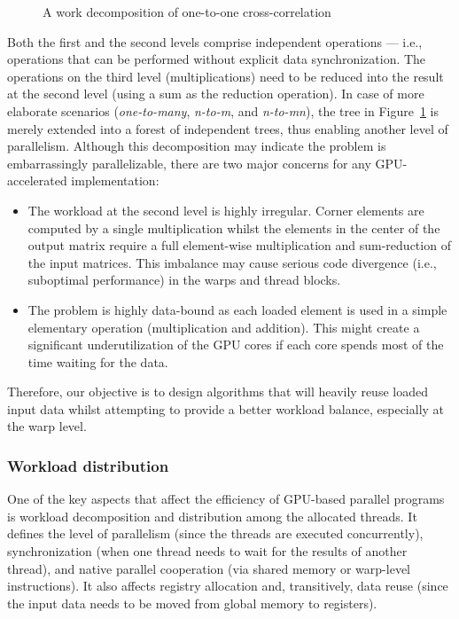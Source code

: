 \begin{figure}[ht]
	\fontsize{5}{6}\selectfont
	\centering
	\def\svgwidth{0.65\textwidth}
	
	\caption{A work decomposition of one-to-one cross-correlation}
	\label{fig:cross_corr_one_to_one_tasks}
\end{figure}

Both the first and the second levels comprise independent operations --- i.e., operations that can be performed without explicit data synchronization. The operations on the third level (multiplications) need to be reduced into the result at the second level (using a sum as the reduction operation). In case of more elaborate scenarios (\textit{one-to-many}, \textit{n-to-m}, and \textit{n-to-mn}), the tree in Figure~\ref{fig:cross_corr_one_to_one_tasks} is merely extended into a forest of independent trees, thus enabling another level of parallelism. Although this decomposition may indicate the problem is embarrassingly parallelizable, there are two major concerns for any GPU-accelerated implementation:

\begin{itemize}
	\item The workload at the second level is highly irregular. Corner elements are computed by a single multiplication whilst the elements in the center of the output matrix require a full element-wise multiplication and sum-reduction of the input matrices. This imbalance may cause serious code divergence (i.e., suboptimal performance) in the warps and thread blocks.
	\item The problem is highly data-bound as each loaded element is used in a simple elementary operation (multiplication and addition). This might create a significant underutilization of the GPU cores if each core spends most of the time waiting for the data.
\end{itemize}

Therefore, our objective is to design algorithms that will heavily reuse loaded input data whilst attempting to provide a better workload balance, especially at the warp level.


\subsubsection{Workload distribution}

One of the key aspects that affect the efficiency of GPU-based parallel programs is workload decomposition and distribution among the allocated threads. It defines the level of parallelism (since the threads are executed concurrently), synchronization (when one thread needs to wait for the results of another thread), and native parallel cooperation (via shared memory or warp-level instructions). It also affects registry allocation and, transitively, data reuse (since the input data needs to be moved from global memory to registers).

